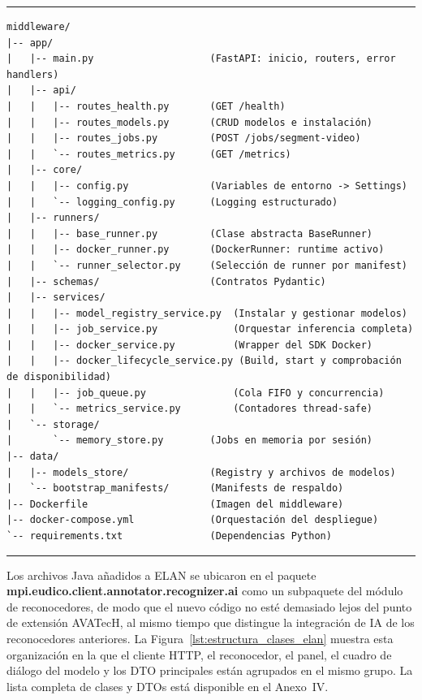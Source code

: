 \documentclass[11pt,a4paper]{article}
\begin{document}
\begin{center}
\begin{minipage}{0.96\textwidth}
\hrule
\vspace{0.10cm}
\scriptsize
\begin{Verbatim}[baselinestretch=0.72]
middleware/
|-- app/
|   |-- main.py                    (FastAPI: inicio, routers, error handlers)
|   |-- api/
|   |   |-- routes_health.py       (GET /health)
|   |   |-- routes_models.py       (CRUD modelos e instalación)
|   |   |-- routes_jobs.py         (POST /jobs/segment-video)
|   |   `-- routes_metrics.py      (GET /metrics)
|   |-- core/
|   |   |-- config.py              (Variables de entorno -> Settings)
|   |   `-- logging_config.py      (Logging estructurado)
|   |-- runners/
|   |   |-- base_runner.py         (Clase abstracta BaseRunner)
|   |   |-- docker_runner.py       (DockerRunner: runtime activo)
|   |   `-- runner_selector.py     (Selección de runner por manifest)
|   |-- schemas/                   (Contratos Pydantic)
|   |-- services/
|   |   |-- model_registry_service.py  (Instalar y gestionar modelos)
|   |   |-- job_service.py             (Orquestar inferencia completa)
|   |   |-- docker_service.py          (Wrapper del SDK Docker)
|   |   |-- docker_lifecycle_service.py (Build, start y comprobación de disponibilidad)
|   |   |-- job_queue.py               (Cola FIFO y concurrencia)
|   |   `-- metrics_service.py         (Contadores thread-safe)
|   `-- storage/
|       `-- memory_store.py        (Jobs en memoria por sesión)
|-- data/
|   |-- models_store/              (Registry y archivos de modelos)
|   `-- bootstrap_manifests/       (Manifests de respaldo)
|-- Dockerfile                     (Imagen del middleware)
|-- docker-compose.yml             (Orquestación del despliegue)
`-- requirements.txt               (Dependencias Python)
\end{Verbatim}
\vspace{0.03cm}
\hrule

\label{lst:estructura_directorios}
\end{minipage}
\end{center}

Los archivos Java añadidos a ELAN se ubicaron en el paquete \textbf{mpi.eudico.client.annotator.recognizer.ai} como un subpaquete del módulo de reconocedores, de modo que el nuevo código no esté demasiado lejos del punto de extensión AVATecH, al mismo tiempo que distingue la integración de IA de los reconocedores anteriores. La Figura~\ref{lst:estructura_clases_elan} muestra esta organización en la que el cliente HTTP, el reconocedor, el panel, el cuadro de diálogo del modelo y los DTO principales están agrupados en el mismo grupo. La lista completa de clases y DTOs está disponible en el Anexo~IV.
\end{document}
